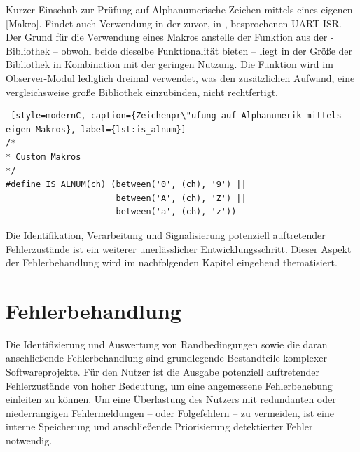 \vspace{0.60cm}
Kurzer Einschub zur Pr\"ufung auf Alphanumerische Zeichen mittels eines eigenen [Makro]. Findet auch Verwendung in der zuvor, in , besprochenen UART-ISR. Der Grund f\"ur die Verwendung eines Makros anstelle der Funktion  aus der -Bibliothek -- obwohl beide dieselbe Funktionalit\"at bieten -- liegt in der Gr\"o{\ss}e der Bibliothek in Kombination mit der geringen Nutzung. Die Funktion wird im Observer-Modul lediglich dreimal verwendet, was den zus\"atzlichen Aufwand, eine vergleichsweise gro{\ss}e Bibliothek einzubinden, nicht rechtfertigt.

\vspace{0.5cm}
\begin{lstlisting} [style=modernC, caption={Zeichenpr\"ufung auf Alphanumerik mittels eigen Makros}, label={lst:is_alnum}]
/*
* Custom Makros
*/
#define IS_ALNUM(ch) (between('0', (ch), '9') || 
					  between('A', (ch), 'Z') || 
					  between('a', (ch), 'z'))
\end{lstlisting}

Die Identifikation, Verarbeitung und Signalisierung potenziell auftretender Fehlerzust\"ande ist ein weiterer unerl\"asslicher Entwicklungsschritt. Dieser Aspekt der Fehlerbehandlung wird im nachfolgenden Kapitel eingehend thematisiert.\AI


\newpage
\section{Fehlerbehandlung}
\label{sec:Fehlerbehandlung}

Die Identifizierung und Auswertung von Randbedingungen sowie die daran anschlie{\ss}ende Fehlerbehandlung sind grundlegende Bestandteile komplexer Softwareprojekte. F\"ur den Nutzer ist die Ausgabe potenziell auftretender Fehlerzust\"ande von hoher Bedeutung, um eine angemessene Fehlerbehebung einleiten zu k\"onnen. Um eine \"Uberlastung des Nutzers mit redundanten oder niederrangigen Fehlermeldungen -- oder Folgefehlern -- zu vermeiden, ist eine interne Speicherung und anschlie{\ss}ende Priorisierung detektierter Fehler notwendig. 

